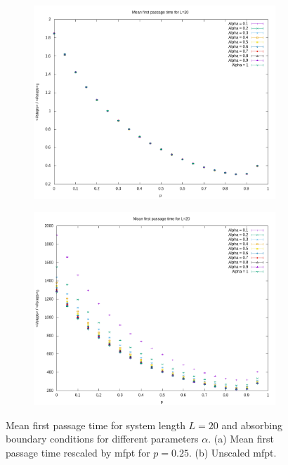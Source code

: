 \documentclass[]{scrartcl}
\begin{document}
 \begin{figure}[!hbt]
\centering
\begin{subfigure}{0.45\textwidth}
 \includegraphics[width=\textwidth]{./fig/alpha/L=20/fpt.png}
\end{subfigure}
\begin{subfigure}{0.45\textwidth}
 \includegraphics[width=\textwidth]{./fig/alpha/L=20/fpt2.png}
\end{subfigure}
\caption{Mean first passage time for system length $L = 20$ and absorbing boundary conditions for different parameters $\alpha$. (a) Mean first passage time rescaled by mfpt for $p = 0.25$. (b) Unscaled mfpt.} 
\label{fig:alpha-fpts20}
\end{figure}
\end{document}

